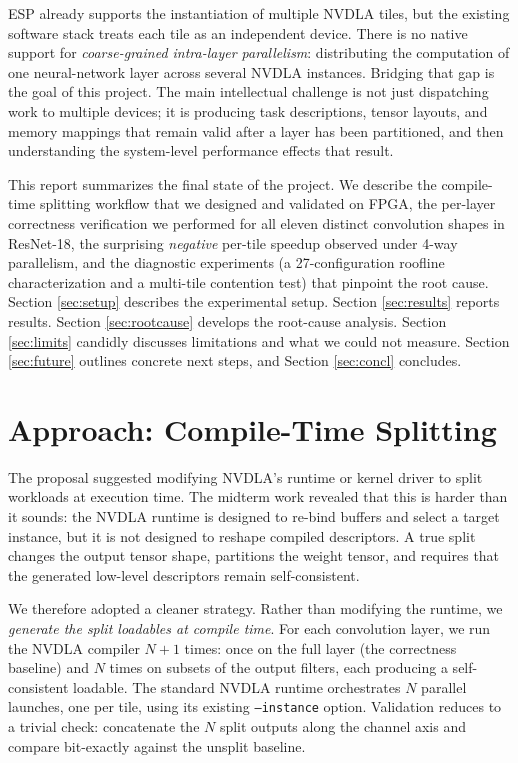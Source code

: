 \documentclass[10pt,sigconf,nonacm]{acmart}
\begin{document}
ESP already supports the instantiation of multiple NVDLA tiles, but
the existing software stack treats each tile as an independent device.
There is no native support for \emph{coarse-grained intra-layer
parallelism}: distributing the computation of one neural-network layer
across several NVDLA instances. Bridging that gap is the goal of this
project. The main intellectual challenge is not just dispatching work
to multiple devices; it is producing task descriptions, tensor layouts,
and memory mappings that remain valid after a layer has been
partitioned, and then understanding the system-level performance effects
that result.

This report summarizes the final state of the project. We describe the
compile-time splitting workflow that we designed and validated on
FPGA, the per-layer correctness verification we performed for all
eleven distinct convolution shapes in ResNet-18, the surprising
\emph{negative} per-tile speedup observed under 4-way parallelism, and
the diagnostic experiments (a 27-configuration roofline characterization
and a multi-tile contention test) that pinpoint the root cause. Section
\ref{sec:setup} describes the experimental setup. Section
\ref{sec:results} reports results. Section \ref{sec:rootcause}
develops the root-cause analysis. Section \ref{sec:limits} candidly
discusses limitations and what we could not measure. Section
\ref{sec:future} outlines concrete next steps, and Section
\ref{sec:concl} concludes.


\section{Approach: Compile-Time Splitting}\label{sec:approach}

The proposal suggested modifying NVDLA's runtime or kernel driver to
split workloads at execution time. The midterm work revealed that
this is harder than it sounds: the NVDLA runtime is designed to
re-bind buffers and select a target instance, but it is not designed
to reshape compiled descriptors. A true split changes the output
tensor shape, partitions the weight tensor, and requires that the
generated low-level descriptors remain self-consistent.

We therefore adopted a cleaner strategy. Rather than modifying the
runtime, we \emph{generate the split loadables at compile time}.
For each convolution layer, we run the NVDLA compiler $N+1$ times:
once on the full layer (the correctness baseline) and $N$ times on
subsets of the output filters, each producing a self-consistent
loadable. The standard NVDLA runtime orchestrates $N$ parallel
launches, one per tile, using its existing \texttt{--instance}
option. Validation reduces to a trivial check: concatenate the $N$
split outputs along the channel axis and compare bit-exactly against
the unsplit baseline.
\end{document}
